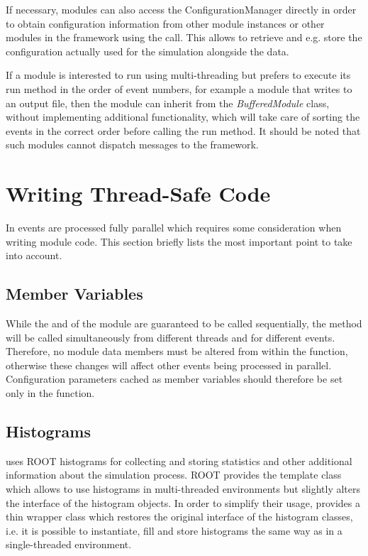 If necessary, modules can also access the ConfigurationManager directly in order to obtain configuration information from other module instances or other modules in the framework using the  call.
This allows to retrieve and e.g. store the configuration actually used for the simulation alongside the data.

If a module is interested to run using multi-threading but prefers to execute its run method in the order of event numbers, for example a module that writes to an output file, then the module can inherit from the \textit{BufferedModule} class, without implementing additional functionality, which will take care of sorting the events in the correct order before calling the run method.
It should be noted that such modules cannot dispatch messages to the framework.


\section{Writing Thread-Safe Code}
\label{sec:module_multithreading}

In \apsq events are processed fully parallel which requires some consideration when writing module code.
This section briefly lists the most important point to take into account.

\subsection{Member Variables}
\label{sec:multithreading_members}

While the  and  of the module are guaranteed to be called sequentially, the  method will be called simultaneously from different threads and for different events.
Therefore, no module data members must be altered from within the  function, otherwise these changes will affect other events being processed in parallel.
Configuration parameters cached as member variables should therefore be set only in the  function.

\subsection{Histograms}

\apsq uses ROOT histograms for collecting and storing statistics and other additional information about the simulation process.
ROOT provides the template class  which allows to use histograms in multi-threaded environments but slightly alters the interface of the histogram objects.
In order to simplify their usage, \apsq provides a thin wrapper class which restores the original interface of the histogram classes, i.e. it is possible to instantiate, fill and store histograms the same way as in a single-threaded environment.

